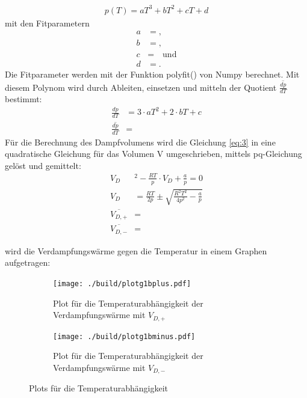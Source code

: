 \begin{align}
    p(T)= aT^3 +bT^2 +cT +d \label{eq:9}
\end{align}
mit den Fitparametern
\begin{subequations} \label{eq:10}
\begin{align}
    a &= \text{}, \label{eq:10a}\\
    b &= \text{}, \label{eq:10b}\\
    c &= \text{} \quad \text{und} \label{eq:10c}\\
    d &= \text{}. \label{eq:10d}
\end{align}
\end{subequations}
Die Fitparameter werden mit der Funktion polyfit() von Numpy \cite{numpy} berechnet.
Mit diesem Polynom wird durch Ableiten, einsetzen und mitteln der Quotient $\overline{\frac{dp}{dT}}$ bestimmt:
\begin{align} 
    \frac{dp}{dT}&= 3\cdot a T^2+2\cdot b T+c \label{eq:11}\\
    \overline{\frac{dp}{dT}}&= \text{} \label{eq:12}
\end{align}
Für die Berechnung des Dampfvolumens wird die Gleichung \eqref{eq:3} in eine 
quadratische Gleichung für das Volumen V umgeschrieben, mittels pq-Gleichung gelöst
und gemittelt:
\begin{subequations} \label{eq:13}
\begin{align}
    V_D&^2-\frac{RT}{p}\cdot V_D+\frac{a}{p}=0 \label{eq:13a}\\
    V_D&= \frac{RT}{2p} \pm \sqrt{\frac{R^2T^2}{4p^2} -\frac{a}{p} } \label{eq:13b}\\
    \overline{V_{D,+}}&= \text{} \label{eq:13c}\\
    \overline{V_{D,-}}&= \text{} \label{eq:13d}
\end{align}
\end{subequations}

\justifying wird die Verdampfungswärme gegen die Temperatur in einem Graphen aufgetragen:

\begin{figure}[H]
\begin{subfigure}{0.495\linewidth}
    \centering
    \texttt{[image: ./build/plotg1bplus.pdf]}
    \caption{Plot für die Temperaturabhängigkeit der Verdampfungswärme mit $V_{D,+}$}
    \label{fig:5a}
\end{subfigure}
\begin{subfigure}{0.495\linewidth}
    \centering
    \texttt{[image: ./build/plotg1bminus.pdf]}
    \caption{Plot für die Temperaturabhängigkeit der Verdampfungswärme mit $V_{D,-}$}
    \label{fig:5b}
\end{subfigure}
\caption{Plots für die Temperaturabhängigkeit\label{fig:5}}
\end{figure}

